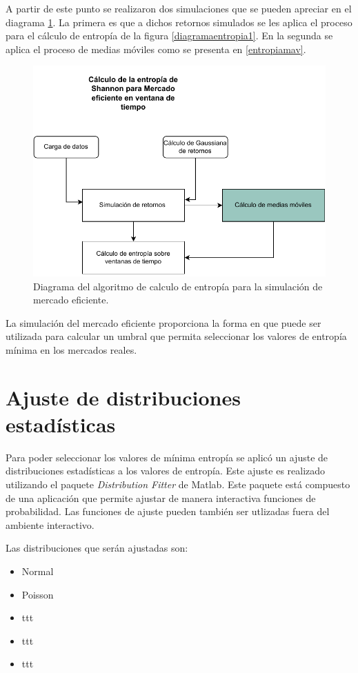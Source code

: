 A partir de este punto se realizaron dos simulaciones que se pueden apreciar en el diagrama \ref{simulacion}.
La primera es que a dichos retornos simulados se les aplica el proceso para el cálculo de entropía de la figura \ref{diagramaentropia1}.
En la segunda se aplica el proceso de medias móviles como se presenta en \ref{entropiamav}.

\begin{figure}
	\centering
	\includegraphics[width=0.9\linewidth]{figures/simulacion}
	\caption{Diagrama del algoritmo de calculo de entropía para la simulación de mercado eficiente. }
	\label{simulacion}
\end{figure}

La simulación del mercado eficiente proporciona la forma en que puede ser utilizada para calcular un umbral que permita seleccionar los valores de entropía mínima en los mercados reales. 
 
\section{Ajuste de distribuciones estadísticas}
\label{ajuste}
Para poder seleccionar los valores de mínima entropía se aplicó un ajuste de distribuciones estadísticas a los valores de entropía.
Este ajuste es realizado utilizando el paquete \textit{Distribution Fitter} de Matlab.
Este paquete está compuesto de una aplicación que permite ajustar de manera interactiva funciones de probabilidad.
Las funciones de ajuste pueden también ser utlizadas fuera del ambiente interactivo.

Las distribuciones que serán ajustadas son:

\begin{itemize}
	\item Normal
	\item Poisson
	\item ttt
	\item ttt
	\item ttt
\end{itemize}


